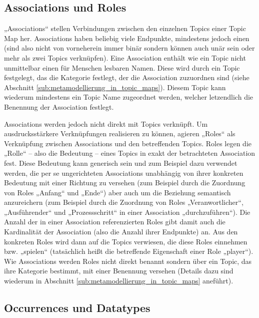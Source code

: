 
\subsection{Associations und Roles} %
\label{sub:associations_und_roles}

„Associations“ stellen Verbindungen zwischen den einzelnen Topics einer Topic Map her. Associations haben beliebig viele Endpunkte, mindestens jedoch einen (sind also nicht von vorneherein immer binär sondern können auch unär sein oder mehr als zwei Topics verknüpfen). Eine Association enthält wie ein Topic nicht unmittelbar einen für Menschen lesbaren Namen. Diese wird durch ein Topic festgelegt, das die Kategorie festlegt, der die Association zuzuordnen sind (siehe Abschnitt \ref{sub:metamodellierung_in_topic_maps}). Diesem Topic kann wiederum mindestens ein Topic Name zugeordnet werden, welcher letzendlich die Benennung der Association festlegt.

Associations werden jedoch nicht direkt mit Topics verknüpft. Um ausdrucksstärkere Verknüpfungen realisieren zu können, agieren „Roles“ als Verknüpfung zwischen Associations und den betreffenden Topics. Roles legen die „Rolle“ -- also die Bedeutung -- eines Topics in exakt der betrachteten Association fest. Diese Bedeutung kann generisch sein und zum Beispiel dazu verwendet werden, die per se ungerichteten Associations unabhängig von ihrer konkreten Bedeutung mit einer Richtung zu versehen (zum Beispiel durch die Zuordnung von Roles „Anfang“ und „Ende“) aber auch um die Beziehung semantisch anzureichern (zum Beispiel durch die Zuordnung von Roles „Veranwortlicher“, „Ausführender“ und „Prozessschritt“ in einer Association „durchzuführen“). Die Anzahl der in einer Association referenzierten Roles gibt damit auch die Kardinalität der Association (also die Anzahl ihrer Endpunkte) an. Aus den konkreten Roles wird dann auf die Topics verwiesen, die diese Roles einnehmen bzw. „spielen“ (tatsächlich heißt die betreffende Eigenschaft einer Role „player“). Wie Associations werden Roles nicht direkt benannt sondern über ein Topic, das ihre Kategorie bestimmt, mit einer Benennung versehen (Details dazu sind wiederum in Abschnitt \ref{sub:metamodellierung_in_topic_maps} aneführt).


\subsection{Occurrences und Datatypes} %
\label{sub:occurrences_und_datatypes}

